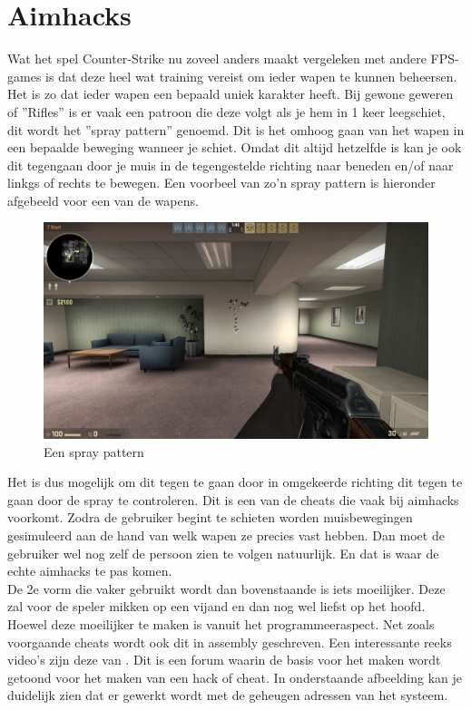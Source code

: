 \documentclass[pdftex,a4paper,12pt,twoside]{report}
\begin{document}
\section{Aimhacks}
\label{sec:aim}
Wat het spel Counter-Strike nu zoveel anders maakt vergeleken met andere FPS-games is dat deze heel wat training vereist om ieder wapen te kunnen beheersen. Het is zo dat ieder wapen een bepaald uniek karakter heeft. Bij gewone geweren of ''Rifles'' is er vaak een patroon die deze volgt als je hem in 1 keer leegschiet, dit wordt het ''spray pattern'' genoemd. Dit is het omhoog gaan van het wapen in een bepaalde beweging wanneer je schiet. Omdat dit altijd hetzelfde is kan je ook dit tegengaan door je muis in de tegengestelde richting naar beneden en/of naar linkgs of rechts te bewegen. Een voorbeel van zo'n spray pattern is hieronder afgebeeld voor een van de wapens.

\begin{figure}[!hb]
\centering
\includegraphics[width=15cm]{img/spraypattern-example}
\caption{Een spray pattern}
\end{figure}  

Het is dus mogelijk om dit tegen te gaan door in omgekeerde richting dit tegen te gaan door de spray te controleren. Dit is een van de cheats die vaak bij aimhacks voorkomt. Zodra de gebruiker begint te schieten worden muisbewegingen gesimuleerd aan de hand van welk wapen ze precies vast hebben. Dan moet de gebruiker wel nog zelf de persoon zien te volgen natuurlijk. En dat is waar de echte aimhacks te pas komen.
\\

De 2e vorm die vaker gebruikt wordt dan bovenstaande is iets moeilijker. Deze zal voor de speler mikken op een vijand en dan nog wel liefst op het hoofd. Hoewel deze moeilijker te maken is vanuit het programmeeraspect. Net zoals voorgaande cheats wordt ook dit in assembly geschreven. Een interessante reeks video's zijn deze van \cite{basicaimbottutorial}. Dit is een forum waarin de basis voor het maken wordt getoond voor het maken van een hack of cheat. In onderstaande afbeelding kan je duidelijk zien dat er gewerkt wordt met de geheugen adressen van het systeem. 
\end{document}
